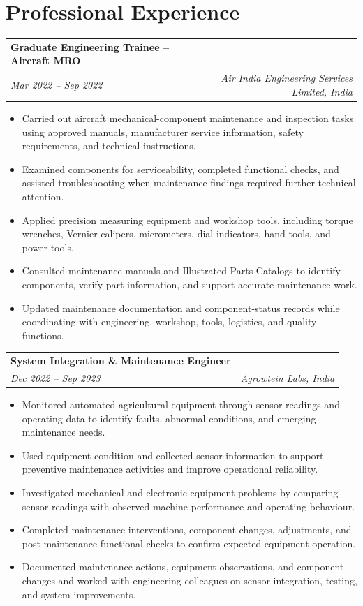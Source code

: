 \documentclass[a4paper,10pt]{article}
\makeatletter
\newcommand{\resumeSubheading}[4]{
\begin{tabularx}{\textwidth}{@{}X r@{}}
\textbf{#1} & #2 \\
\textit{#3} & \textit{#4}
\end{tabularx}
\vspace{2pt}
}
\makeatother
\begin{document}
\section*{Professional Experience}

\resumeSubheading{Graduate Engineering Trainee -- Aircraft MRO}{}{Mar 2022 -- Sep 2022}{Air India Engineering Services Limited, India}
\begin{itemize}
\item Carried out aircraft mechanical-component maintenance and inspection tasks using approved manuals, manufacturer service information, safety requirements, and technical instructions.
\item Examined components for serviceability, completed functional checks, and assisted troubleshooting when maintenance findings required further technical attention.
\item Applied precision measuring equipment and workshop tools, including torque wrenches, Vernier calipers, micrometers, dial indicators, hand tools, and power tools.
\item Consulted maintenance manuals and Illustrated Parts Catalogs to identify components, verify part information, and support accurate maintenance work.
\item Updated maintenance documentation and component-status records while coordinating with engineering, workshop, tools, logistics, and quality functions.
\end{itemize}

\resumeSubheading{System Integration \& Maintenance Engineer}{}{Dec 2022 -- Sep 2023}{Agrowtein Labs, India}
\begin{itemize}
\item Monitored automated agricultural equipment through sensor readings and operating data to identify faults, abnormal conditions, and emerging maintenance needs.
\item Used equipment condition and collected sensor information to support preventive maintenance activities and improve operational reliability.
\item Investigated mechanical and electronic equipment problems by comparing sensor readings with observed machine performance and operating behaviour.
\item Completed maintenance interventions, component changes, adjustments, and post-maintenance functional checks to confirm expected equipment operation.
\item Documented maintenance actions, equipment observations, and component changes and worked with engineering colleagues on sensor integration, testing, and system improvements.
\end{itemize}
\end{document}
